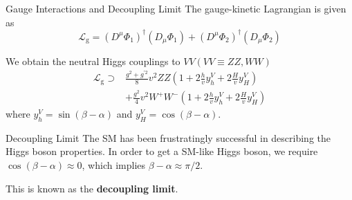 \documentclass{../bredelebeamer}
\begin{document}
\begin{frame}{Gauge Interactions and Decoupling Limit}
  The gauge-kinetic Lagrangian is given as
  $$
  \mathcal{L}_{\mathrm{g}}=\left(D^\mu \Phi_1\right)^{\dagger}\left(D_\mu \Phi_1\right)+\left(D^\mu \Phi_2\right)^{\dagger}\left(D_\mu \Phi_2\right)
  $$


  We obtain the neutral Higgs couplings to $V V(V V \equiv Z Z, W W)$
  $$
  \begin{aligned}
  \mathcal{L}_{\mathrm{g}} \supset & \frac{g^2+g^{\prime 2}}{8} v^2 Z Z\left(1+2 \frac{h}{v} y_h^V+2 \frac{H}{v} y_H^V\right) \\
  & +\frac{g^2}{4} v^2 W^{+} W^{-}\left(1+2 \frac{h}{v} y_h^V+2 \frac{H}{v} y_H^V\right)
  \end{aligned}
  $$
  where $y_h^V=\sin (\beta-\alpha)$ and $y_H^V=\cos (\beta-\alpha)$.
  \vfill \pause

  

  \begin{block}{Decoupling Limit}
    The SM has been frustratingly successful in describing the Higgs boson properties. In order to get a SM-like Higgs boson, we require $\cos(\beta-\alpha) \approx 0$, which implies $\beta - \alpha \approx \pi/2$. 
    
    This is known as the \textbf{decoupling limit}.
  \end{block}
\end{frame}
\end{document}
